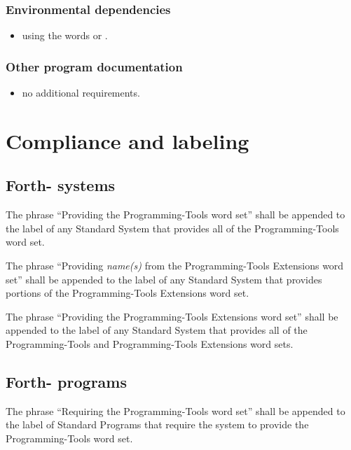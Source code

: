 \subsubsection{Environmental dependencies} %

\begin{itemize}
\item using the words  or
	.
\end{itemize}

\subsubsection{Other program documentation} %

\begin{itemize}
\item no additional requirements.
\end{itemize}

\section{Compliance and labeling} %
\enlargethispage{2ex}
\subsection{Forth-\snapshot{} systems} %

The phrase ``Providing the Programming-Tools word set'' shall be
appended to the label of any Standard System that provides all of
the Programming-Tools word set.

The phrase ``Providing \emph{name(s)} from the Programming-Tools
Extensions word set'' shall be appended to the label of any Standard
System that provides portions of the Programming-Tools Extensions
word set.

The phrase ``Providing the Programming-Tools Extensions word set''
shall be appended to the label of any Standard System that provides
all of the Programming-Tools and Programming-Tools Extensions word
sets.

\subsection{Forth-\snapshot{} programs} %

The phrase ``Requiring the Programming-Tools word set'' shall be
appended to the label of Standard Programs that require the system
to provide the Programming-Tools word set.

